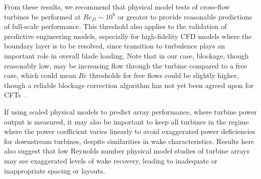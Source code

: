 From these results, we recommend that physical model tests of cross-flow
turbines be performed at $Re_D \sim 10^6$ or greater to provide reasonable
predictions of full-scale performance. This threshold also applies to the
validation of predictive engineering models, especially for high-fidelity CFD
models where the boundary layer is to be resolved, since transition to
turbulence plays an important role in overall blade loading. Note that in our
case, blockage, though reasonably low, may be increasing flow through the
turbine compared to a free case, which could mean $Re$ thresholds for free flows
could be slightly higher, though a reliable blockage correction algorithm has
not yet been agreed upon for CFTs~\cite{Cavagnaro2014}.

If using scaled physical models to predict array performance, where turbine
power output is measured, it may also be important to keep all turbines in the
regime where the power coefficient varies linearly to avoid exaggerated power
deficiencies for downstream turbines, despite similarities in wake
characteristics. Results here also suggest that low Reynolds number physical
model studies of turbine arrays may see exaggerated levels of wake recovery,
leading to inadequate or inappropriate spacing or layouts.